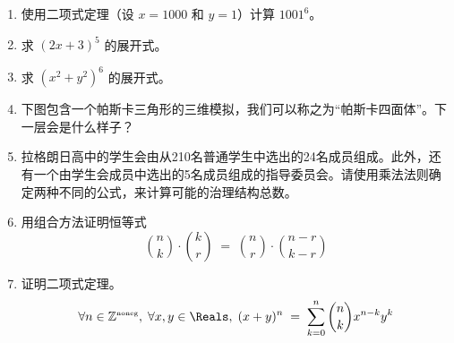 \begin{enumerate}

    \item 使用二项式定理（设 $x=1000$ 和 $y=1$）计算 $1001^6$。
    
    \wbvfill
    
    \item 求 $(2x+3)^5$ 的展开式。
    
    \wbvfill
    
    \item 求 $(x^2+y^2)^6$ 的展开式。
    \wbvfill
    
    \workbookpagebreak
    
    \item 下图包含一个帕斯卡三角形的三维模拟，我们可以称之为“帕斯卡四面体”。下一层会是什么样子？
    \begin{center}
    
    \end{center}
    
    \wbvfill
    
    \item 拉格朗日高中的学生会由从210名普通学生中选出的24名成员组成。此外，还有一个由学生会成员中选出的5名成员组成的指导委员会。请使用乘法法则确定两种不同的公式，来计算可能的治理结构总数。
    \wbvfill
    
    \workbookpagebreak
    
    \item 用组合方法证明恒等式
    \[ \binom{n}{k} \cdot \binom{k}{r} \; = \; \binom{n}{r} \cdot \binom{n-r}{k-r} \]
    
    \wbvfill
    
    \item 证明二项式定理。
    \[ \forall n \in \Naturals, \; \forall x,y \in \Reals, \; 
    (x+y)^n \; = \; \sum_{k=0}^n \binom{n}{k} x^{n-k}y^k \]
    
    \wbvfill
    
    \workbookpagebreak
    
    \end{enumerate}
    
